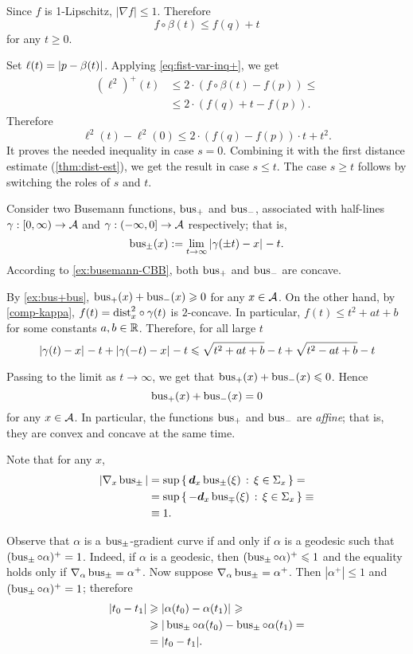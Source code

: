 Since $f$ is 1-Lipschitz, $|\nabla f|\le1$.
Therefore 
\[f\circ\beta(t)\le f(q)+t\]
for any $t\ge0$.

Set $\ell(t)=|{p}-{\beta(t)}|_{}^{{}}$.
Applying \ref{eq:fist-var-inq+}, we get
\begin{align*}
(\ell^2)^+(t)
&\le 2\cdot \left(f\circ\beta(t)-f(p)\right)\le 
\\
&\le2\cdot\left(f(q)+t-f(p)\right).
\end{align*}
Therefore 
\[\ell^2(t)-\ell^2(0)\le 2\cdot\left(f(q)-f(p)\right)\cdot t + t^2.\]
It proves the needed inequality in case $s=0$.
Combining it with the first distance estimate (\ref{thm:dist-est}), we get the result in case $s\le t$.
The case $s\ge t$ follows by switching the roles of $s$ and $t$.
\qeds


 Consider two Busemann functions, $\operatorname{\rm bus}\nolimits_+$ and $\operatorname{\rm bus}\nolimits_-$, associated with half-lines $\gamma:[0,\infty)\to \mathcal{A}$ and $\gamma:(-\infty,0]\to \mathcal{A}$ respectively; that is,
\[
\operatorname{\rm bus}\nolimits_\pm(x)
\mathrel{:=}
\lim_{t\to\infty}|{\gamma(\pm t)}-{x}|_{}^{{}}- t.
\]
According to \ref{ex:busemann-CBB}, 
both $\operatorname{\rm bus}\nolimits_+$ and $\operatorname{\rm bus}\nolimits_-$ are concave.

By \ref{ex:bus+bus}, $\operatorname{\rm bus}\nolimits_+(x)+\operatorname{\rm bus}\nolimits_-(x)\geqslant0$ for any $x\in \mathcal{A}$.
On the other hand, by \ref{comp-kappa}, 
$f(t)=\mathrm{dist}_x^2\circ\gamma(t)$ 
is $2$-concave.
In particular, $f(t)\le t^2+at+b$ for some constants $a,b\in\mathbb{R}$.  Therefore, for all large $t$
\[
|{\gamma( t)}-{x}|_{}^{{}}- t +|{\gamma(- t)}-{x}|_{}^{{}}- t\leqslant \sqrt{ t^2+at+b}-t+\sqrt{ t^2-at+b}-t
\]

Passing to the limit as $t\to\infty$, we get that  $\operatorname{\rm bus}\nolimits_+(x)+\operatorname{\rm bus}\nolimits_-(x)\leqslant 0$.
Hence
\[
\operatorname{\rm bus}\nolimits_+(x)+\operatorname{\rm bus}\nolimits_-(x)= 0
\]
for any $x\in \mathcal{A}$.
In particular, the functions $\operatorname{\rm bus}\nolimits_+$ and $\operatorname{\rm bus}\nolimits_-$ are \emph{affine};
that is, they are convex and concave at the same time.

Note that for any $x$,
\begin{align*}
|\nabla_x \operatorname{\rm bus}\nolimits_\pm|
&=\sup\left\{\,{\bm{d}_x\operatorname{\rm bus}\nolimits_\pm(\xi)}\,:\,{\xi\in\Sigma_x}\,\right\}=
\\
&=\sup\left\{\,{-\bm{d}_x\operatorname{\rm bus}\nolimits_\mp(\xi)}\,:\,{\xi\in\Sigma_x}\,\right\}\equiv
\\
&\equiv1.
\end{align*}

Observe that $\alpha$ is a $\operatorname{\rm bus}\nolimits_\pm$-gradient curve
if and only if $\alpha$ is a geodesic such that $(\operatorname{\rm bus}\nolimits_\pm\circ\alpha)^+=1$.
Indeed, if $\alpha$ is a geodesic, then $(\operatorname{\rm bus}\nolimits_\pm\circ\alpha)^+\leqslant 1$ and the equality holds only if $\nabla_\alpha\operatorname{\rm bus}\nolimits_\pm=\alpha^+$.
Now suppose $\nabla_\alpha\operatorname{\rm bus}\nolimits_\pm=\alpha^+$.
Then $|\alpha^+|\le 1$ and $(\operatorname{\rm bus}\nolimits_\pm\circ\alpha)^+=1$; therefore 
\begin{align*}
|t_0-t_1|&\geqslant |{\alpha(t_0)}-{\alpha(t_1)}|_{}^{{}}\geqslant
\\
&\geqslant|\operatorname{\rm bus}\nolimits_\pm\circ\alpha(t_0)-\operatorname{\rm bus}\nolimits_\pm\circ\alpha(t_1)=
\\
&=|t_0-t_1|.
\end{align*}


